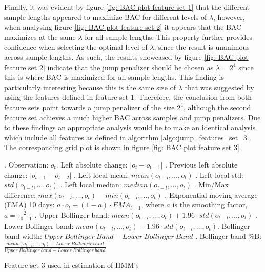 Finally, it was evident by figure \ref{fig: BAC plot feature set 1} that the different sample lengths appeared to maximize BAC for different levels of $\lambda$, however, when analysing figure \ref{fig: BAC plot feature set 2} it appears that the BAC maximizes at the same $\lambda$ for all sample lengths. This property further provides confidence when selecting the optimal level of $\lambda$, since the result is unanimous across sample lengths. As such, the results showcased by figure \ref{fig: BAC plot feature set 2} indicate that the jump penalizer should be chosen as $\lambda = 2^4$ since this is where BAC is maximized for all sample lengths. This finding is particularly interesting because this is the same size of $\lambda$ that was suggested by using the features defined in feature set 1. Therefore, the conclusion from both feature sets point towards a jump penalizer of the size $2^4$, although the second feature set achieves a much higher BAC across samples and jump penalizers. Due to these findings an appropriate analysis would be to make an identical analysis which include all features as defined in algorithm \ref{algo:jump_features_set_3}. The corresponding grid plot is shown in figure \ref{fig: BAC plot feature set 3}.

\begin{algorithm}[H]
. Observation: $o_t$. Left absolute change: $|o_t-o_{t-1}|$ . Previous left absolute change: $|o_{t-1}-o_{t-2}|$ . Left local mean: $mean(o_{t-l},\ldots,o_{t})$ . Left local std: $std(o_{t-l},\ldots, o_{t})$ . Left local median: $median(o_{t-l},\ldots,o_{t})$ . Min/Max difference: $max(o_{t-l},\ldots,o_{t}) - min(o_{t-l},\ldots,o_{t})$ . Exponential moving average (EMA) 10 days: $a \cdot o_t + (1-a) \cdot EMA_{t-1}$, \quad where $a$ is the smoothing factor, $a = \frac{2}{10+1}$ . Upper Bollinger band: $mean(o_{t-l},\ldots,o_t) + 1.96 \cdot std(o_{t-l},\ldots,o_t)$ . Lower Bollinger band: $mean(o_{t-l},\ldots,o_t) - 1.96 \cdot std(o_{t-l},\ldots,o_t)$. Bollinger band width: $Upper\ Bollinger\ Band - Lower\  Bollinger\ Band$ . Bollinger band \%B: $\frac{mean(o_{t-l},\ldots,o_{t}) - Lower\ Bollinger\ band} {Upper\ Bollinger\ band - Lower\ Bollinger\ band}$  \;
\BlankLine
{}
\caption{Feature set 3 used in \jump estimation of HMM's}
\label{algo:jump_features_set_3}
\end{algorithm}


